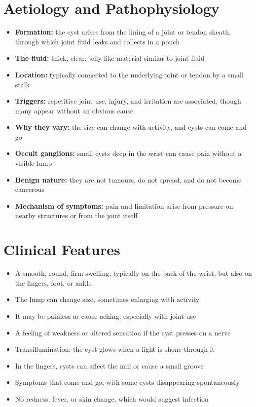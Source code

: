 \section*{Aetiology and Pathophysiology}
\begin{itemize}
    \item \textbf{Formation:} the cyst arises from the lining of a joint or tendon sheath, through which joint fluid leaks and collects in a pouch
    \item \textbf{The fluid:} thick, clear, jelly-like material similar to joint fluid
    \item \textbf{Location:} typically connected to the underlying joint or tendon by a small stalk
    \item \textbf{Triggers:} repetitive joint use, injury, and irritation are associated, though many appear without an obvious cause
    \item \textbf{Why they vary:} the size can change with activity, and cysts can come and go
    \item \textbf{Occult ganglions:} small cysts deep in the wrist can cause pain without a visible lump
    \item \textbf{Benign nature:} they are not tumours, do not spread, and do not become cancerous
    \item \textbf{Mechanism of symptoms:} pain and limitation arise from pressure on nearby structures or from the joint itself
\end{itemize}

\section*{Clinical Features}
\begin{itemize}
    \item A smooth, round, firm swelling, typically on the back of the wrist, but also on the fingers, foot, or ankle
    \item The lump can change size, sometimes enlarging with activity
    \item It may be painless or cause aching, especially with joint use
    \item A feeling of weakness or altered sensation if the cyst presses on a nerve
    \item Transillumination: the cyst glows when a light is shone through it
    \item In the fingers, cysts can affect the nail or cause a small groove
    \item Symptoms that come and go, with some cysts disappearing spontaneously
    \item No redness, fever, or skin change, which would suggest infection
\end{itemize}

